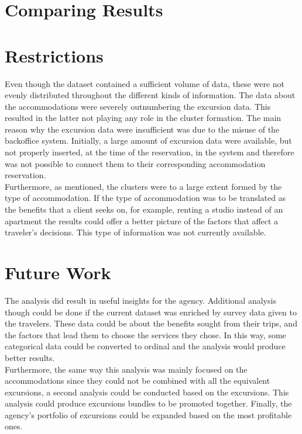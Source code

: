 \section{Comparing Results}
\section{Restrictions}
Even though the dataset contained a sufficient volume of data, these were not evenly distributed throughout the different kinds of information. The data about the accommodations were severely outnumbering the excursion data. This resulted in the latter not playing any role in the cluster formation. The main reason why the excursion data were insufficient was due to the misuse of the backoffice system. Initially, a large amount of excursion data were available, but not properly inserted, at the time of the reservation, in the system and therefore was not possible to connect them to their corresponding accommodation reservation. \\
Furthermore, as mentioned, the clusters were to a large extent formed by the type of accommodation. If the type of accommodation was to be translated as the benefits that a client seeks on, for example, renting a studio instead of an apartment the results could offer a better picture of the factors that affect a traveler's decisions. This type of information was not currently available.
\section{Future Work}
The analysis did result in useful insights for the agency. Additional analysis though could be done if the current dataset was enriched by survey data given to the travelers. These data could be about the benefits sought from their trips, and the factors that lead them to choose the services they chose. In this way, some categorical data could be converted to ordinal and the analysis would produce better results. \\
Furthermore, the same way this analysis was mainly focused on the accommodations since they could not be combined with all the equivalent excursions, a second analysis could be conducted based on the excursions. This analysis could produce excursions bundles to be promoted together. Finally, the agency's portfolio of excursions could be expanded based on the most profitable ones.